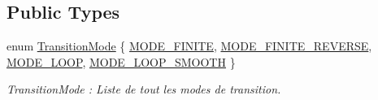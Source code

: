\subsection*{Public Types}
\begin{DoxyCompactItemize}
\item 
enum \hyperlink{classns_transition_1_1_transition_contract_a40118ebf3c1a0a486934ce2b9ddc3edb}{Transition\+Mode} \{ \hyperlink{classns_transition_1_1_transition_contract_a40118ebf3c1a0a486934ce2b9ddc3edba8e6b597d9cc193da6eb40a6be5dc544b}{M\+O\+D\+E\+\_\+\+F\+I\+N\+I\+TE}, 
\hyperlink{classns_transition_1_1_transition_contract_a40118ebf3c1a0a486934ce2b9ddc3edbada40ee822d94803e81878d415e46ef6a}{M\+O\+D\+E\+\_\+\+F\+I\+N\+I\+T\+E\+\_\+\+R\+E\+V\+E\+R\+SE}, 
\hyperlink{classns_transition_1_1_transition_contract_a40118ebf3c1a0a486934ce2b9ddc3edbaaf7f662702b3f37a41b8cfb86598f857}{M\+O\+D\+E\+\_\+\+L\+O\+OP}, 
\hyperlink{classns_transition_1_1_transition_contract_a40118ebf3c1a0a486934ce2b9ddc3edba5aa6e1fbf9670aa9ecd96beff2ba6abb}{M\+O\+D\+E\+\_\+\+L\+O\+O\+P\+\_\+\+S\+M\+O\+O\+TH}
 \}\begin{DoxyCompactList}\small\item\em Transition\+Mode \+: Liste de tout les modes de transition. \end{DoxyCompactList}
\end{DoxyCompactItemize}
